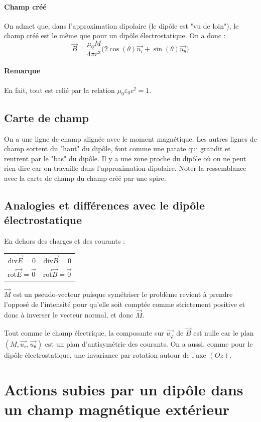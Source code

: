 \documentclass[french]{book}
\theoremstyle{plain}
\theoremstyle{definition}
\theoremstyle{remark}
\newcommand{\rot}{\overrightarrow{\text{rot}}}
\renewcommand{\div}{\text{div}}
\begin{document}
\paragraph{Champ créé} On admet que, dans l'approximation dipolaire (le dipôle est "vu de loin"), le champ créé est le même que pour un dipôle électrostatique. On a donc : $$\overrightarrow{B}=\frac{\mu_0 M}{4\pi r^3}\bigg(2\cos(\theta)\overrightarrow{u_\text{r}}+\sin(\theta)\overrightarrow{u_\theta}\bigg)$$
\paragraph{Remarque} En fait, tout est relié par la relation $\mu_0\varepsilon_0c^2=1$.
\subsection{Carte de champ}
On a une ligne de champ alignée avec le moment magnétique. Les autres lignes de champ sortent du "haut" du dipôle, font comme une patate qui grandit et rentrent par le "bas" du dipôle. Il y a une zone proche du dipôle où on ne peut rien dire car on travaille dans l'approximation dipolaire. Noter la ressemblance avec la carte de champ du champ créé par une spire.
\subsection{Analogies et différences avec le dipôle électrostatique}
En dehors des charges et des courants : 
\begin{center}
	\begin{tabular}{cc}
		$\div\overrightarrow{E}=0$&$\div\overrightarrow{B}=0$\\
		$\rot\overrightarrow{E}=\overrightarrow{0}$&$\rot\overrightarrow{B}=\overrightarrow{0}$
	\end{tabular}
\end{center}
$\overrightarrow{M}$ est un pseudo-vecteur puisque symétriser le problème revient à prendre l'opposé de l'intensité pour qu'elle soit comptée comme strictement positive et donc à inverser le vecteur normal, et donc $\overrightarrow{M}$. \\ \par Tout comme le champ électrique, la composante sur $\overrightarrow{u_\varphi}$ de $\overrightarrow{B}$ est nulle car le plan $(M,\overrightarrow{u_r},\overrightarrow{u_\theta})$ est un plan d'antisymétrie des courants. On a aussi, comme pour le dipôle électrostatique, une invariance par rotation autour de l'axe $(Oz)$.
\section{Actions subies par un dipôle dans un champ magnétique extérieur}
\end{document}
